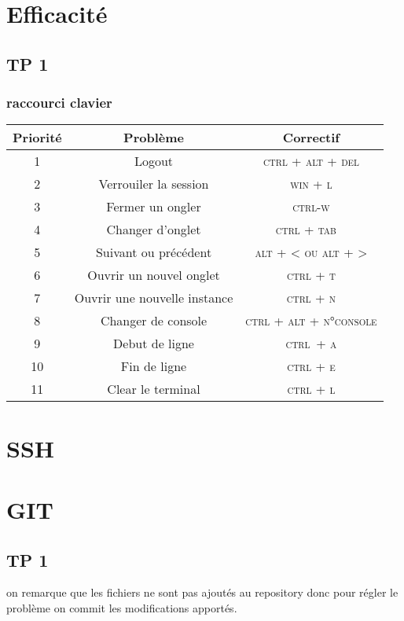 \documentclass{report}
\begin{document}
\chapter{Efficacité}
\section{TP 1}
 
\subsection{raccourci clavier}
\begin{tabular}{|c|c|c|}
	\hline
	\textbf{Priorité} &  \textbf{Problème} & \textbf{Correctif} \\ 
	\hline
	1 & Logout & \textsc{ctrl + alt + del} \\
	\hline
	2 & Verrouiler la session & \textsc{win + l} \\
	\hline  
	3 & Fermer un ongler & \textsc{ctrl-w} \\
	\hline
	4 & Changer d'onglet & \textsc{ctrl + tab}  \\
	\hline
	5 & Suivant ou précédent & \textsc{alt + < ou alt + >} \\
	\hline 
	6 & Ouvrir un nouvel onglet & \textsc{ctrl + t} \\
	\hline
	7 & Ouvrir une nouvelle instance & \textsc{ctrl + n} \\
	\hline 
	8 & Changer de console & \textsc{ctrl + alt + n°console} \\
	\hline 
	9 & Debut de ligne & \textsc{ctrl + a} \\
	\hline 
	10 & Fin de ligne & \textsc{ctrl + e} \\
	\hline 
	11 & Clear le terminal & \textsc{ctrl + l} \\
	\hline 
\end{tabular}


\chapter{SSH}


\chapter{GIT}

\section{TP 1}
on remarque que les fichiers ne sont pas ajoutés au repository donc pour régler le problème 
on commit les modifications apportés.
\end{document}
